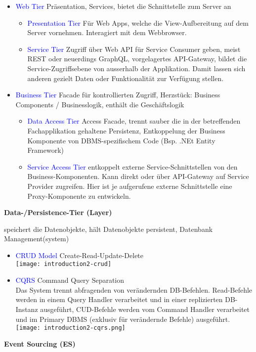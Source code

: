 \begin{itemize}
    \item \textcolor{blue}{Web Tier} Präsentation, Services, bietet die Schnittstelle zum Server an
        \begin{itemize}
            \item \textcolor{blue}{Presentation Tier} Für Web Apps, welche die  View-Aufbereitung auf dem Server vornehmen. Interagiert mit dem Webbrowser.
            \item \textcolor{blue}{Service Tier} Zugriff über Web API für Service Consumer geben, meist REST oder neuerdings GraphQL, vorgelagertes API-Gateway, bildet die Service-Zugriffsebene von ausserhalb der Applikation. Damit lassen sich anderen gezielt Daten oder Funktionalität zur Verfügung stellen.
        \end{itemize}
    \item \textcolor{blue}{Business Tier} Facade für kontrollierten Zugriff, Herzstück: Business Components / Businesslogik, enthält die Geschäftslogik
        \begin{itemize}
            \item \textcolor{blue}{Data Access Tier} Access Facade, trennt sauber die in der betreffenden Fachapplikation gehaltene Persistenz, Entkoppelung der Business Komponente von DBMS-spezifischem Code (Bsp. .NEt Entity Framework)
            \item \textcolor{blue}{Service Access Tier} entkoppelt externe Service-Schnittstellen von den Business-Komponenten. Kann direkt oder über API-Gateway auf Service Provider zugreifen. Hier ist je aufgerufene externe Schnittstelle eine Proxy-Komponente zu entwickeln.
        \end{itemize}
\end{itemize}
\vspace{10pt}
\textbf{Data-/Persistence-Tier (Layer)}

speichert die Datenobjekte, hält Datenobjekte persistent, Datenbank Management(system)

\begin{itemize}
    \item \textcolor{blue}{CRUD Model} Create-Read-Update-Delete \\
    \texttt{[image: introduction2-crud]}
    \item \textcolor{blue}{CQRS} Command Query Separation \\
    Das System trennt abfragenden von verändernden DB-Befehlen. Read-Befehle werden in einem Query Handler verarbeitet und in einer replizierten DB-Instanz ausgeführt, CUD-Befehle werden vom Command Handler verarbeitet und im Primary DBMS (exklusiv für verändernde Befehle) ausgeführt. \\
    \texttt{[image: introduction2-cqrs.png]}
\end{itemize}
\vspace{10pt}
\textbf{Event Sourcing (ES)}

